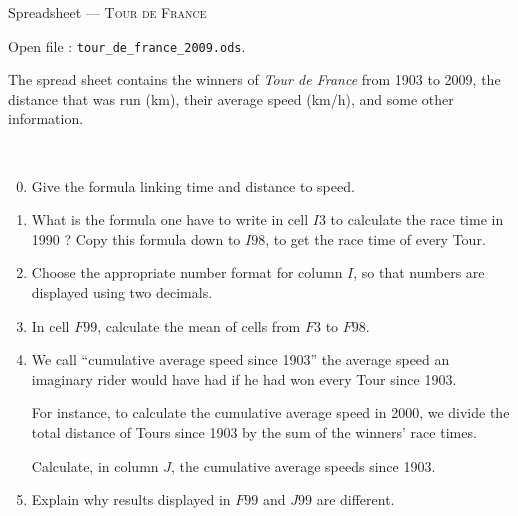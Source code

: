 \documentclass[11pt]{article}
\begin{document}
\begin{center}
  {\large
    Spreadsheet
    ---
    \textsc{Tour de France}
  }
\end{center}

\noindent Open file : \texttt{tour\_de\_france\_2009.ods}.

\noindent The spread sheet contains the winners of \emph{Tour de France} from 1903 to 2009, the distance that was run (km), their average speed (km/h), and some other information.



\begin{question}~

  \begin{enumerate}
      \setcounter{enumi}{-1}
    \item Give the formula linking time and distance to speed.
    \item What is the formula one have to write in cell $I3$ to calculate the race time in 1990 ?
      Copy this formula down to $I98$, to get the race time of every Tour.
    \item Choose the appropriate number format for column $I$, so that numbers are displayed using two decimals.
    \item In cell $F99$, calculate the mean of cells from $F3$ to $F98$.
    \item We call ``cumulative average speed since 1903'' the average speed an imaginary rider would have had if he had won every Tour since 1903.

      For instance, to calculate the cumulative average speed in 2000, we divide the total distance of Tours since 1903 by the sum of the winners' race times.

      Calculate, in column $J$, the cumulative average speeds since 1903.

    \item Explain why results displayed in $F99$ and $J99$ are different.

  \end{enumerate}
\end{question}
\end{document}
